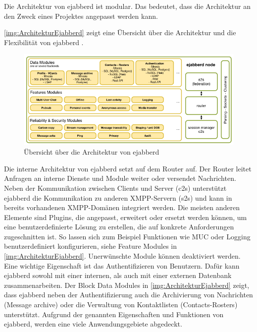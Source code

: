\documentclass[a4paper,titlepage,halfparskip,12pt]{scrreprt}
\begin{document}
\begin{onehalfspacing}
Die Architektur von ejabberd ist modular. Das bedeutet, dass die Architektur an den Zweck eines Projektes angepasst werden kann.

\autoref{img:ArchitekturEjabberd} zeigt eine Übersicht über die Architektur und die Flexibilität von ejabberd \cite{ejabberdModulesDeployment}.

\begin{figure}[h]
	\centering
	\includegraphics[width=\linewidth]{images/ejabberd_internals}
	\caption{Übersicht über die Architektur von ejabberd \cite{ejabberdModulesDeployment}}
	\label{img:ArchitekturEjabberd}
\end{figure}

Die interne Architektur von ejabberd setzt auf dem Router auf. Der Router leitet Anfragen an interne Dienste und Module weiter oder versendet Nachrichten. Neben der Kommunikation zwischen Clients und Server (c2s) unterstützt ejabberd die Kommunikation zu anderen \ac{XMPP}-Servern (s2s) und kann in bereits vorhandenen \ac{XMPP}-Domänen integriert werden. Die meisten anderen Elemente sind Plugins, die angepasst, erweitert oder ersetzt werden können, um eine benutzerdefinierte Lösung zu erstellen, die auf konkrete Anforderungen zugeschnitten ist. So lassen sich zum Beispiel Funktionen wie \ac{MUC} oder Logging benutzerdefiniert konfigurieren, siehe Feature Modules in \autoref{img:ArchitekturEjabberd}. Unerwünschte Module können deaktiviert werden. Eine wichtige Eigenschaft ist das Authentifizieren von Benutzern. Dafür kann ejabberd sowohl mit einer internen, als auch mit einer externen Datenbank zusammenarbeiten. Der Block Data Modules in \autoref{img:ArchitekturEjabberd} zeigt, dass ejabberd neben der Authentifizierung auch die Archivierung von Nachrichten (Message archive) oder die Verwaltung von Kontaktlisten (Contacts-Rosters) unterstützt. Aufgrund der genannten Eigenschaften und Funktionen von ejabberd, werden eine viele Anwendungsgebiete abgedeckt.\cite{ejabberdModulesDeployment, ejabberdDoc}


\end{onehalfspacing}
\end{document}

